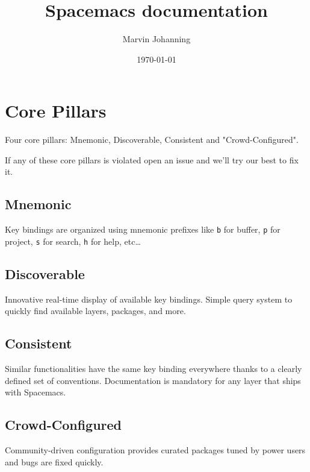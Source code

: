 \documentclass[11pt]{article}
\author{Marvin Johanning}
\date{\today}
\title{Spacemacs documentation}
\begin{document}
\maketitle
\tableofcontents


\section{Core Pillars}
\label{sec:org8c6bcc7}
Four core pillars: Mnemonic, Discoverable, Consistent and "Crowd-Configured".

If any of these core pillars is violated open an issue and we'll try our best
to fix it.

\subsection{Mnemonic}
\label{sec:org830ebda}
Key bindings are organized using mnemonic prefixes like \texttt{b} for buffer, \texttt{p} for
project, \texttt{s} for search, \texttt{h} for help, etc\ldots{}

\subsection{Discoverable}
\label{sec:org7504347}
Innovative real-time display of available key bindings. Simple query
system to quickly find available layers, packages, and more.

\subsection{Consistent}
\label{sec:org20f9f8b}
Similar functionalities have the same key binding everywhere thanks to a
clearly defined set of conventions. Documentation is mandatory for any layer
that ships with Spacemacs.

\subsection{Crowd-Configured}
\label{sec:orgb1da6fa}
Community-driven configuration provides curated packages tuned by power users
and bugs are fixed quickly.
\end{document}
